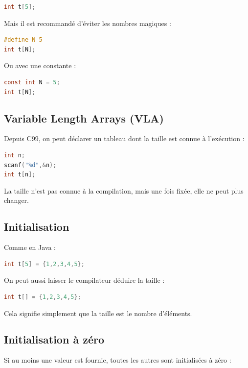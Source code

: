 \begin{lstlisting}[language=C]
int t[5];
\end{lstlisting}

Mais il est recommandé d’éviter les nombres magiques :

\begin{lstlisting}[language=C]
#define N 5
int t[N];
\end{lstlisting}

Ou avec une constante :

\begin{lstlisting}[language=C]
const int N = 5;
int t[N];
\end{lstlisting}

\subsection{Variable Length Arrays (VLA)}

Depuis C99, on peut déclarer un tableau dont la taille est connue
à l’exécution :

\begin{lstlisting}[language=C]
int n;
scanf("%d",&n);
int t[n];
\end{lstlisting}

La taille n’est pas connue à la compilation,
mais une fois fixée, elle ne peut plus changer.

\subsection{Initialisation}

Comme en Java :

\begin{lstlisting}[language=C]
int t[5] = {1,2,3,4,5};
\end{lstlisting}

On peut aussi laisser le compilateur déduire la taille :

\begin{lstlisting}[language=C]
int t[] = {1,2,3,4,5};
\end{lstlisting}

Cela signifie simplement que la taille est le nombre d’éléments.

\subsection{Initialisation à zéro}

Si au moins une valeur est fournie,
toutes les autres sont initialisées à zéro :

